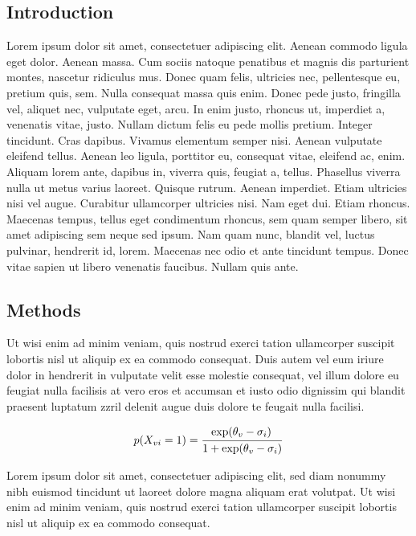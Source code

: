\documentclass[a1paper]{article}
\begin{document}
\begin{posterbox}
	\vspace{-10mm}
	\raggedright

	\section*{Introduction}
	Lorem ipsum dolor sit amet, consectetuer adipiscing elit. Aenean commodo ligula eget dolor. Aenean massa. Cum sociis natoque penatibus et magnis dis parturient montes, nascetur ridiculus mus. Donec quam felis, ultricies nec, pellentesque eu, pretium quis, sem. Nulla consequat massa quis enim. Donec pede justo, fringilla vel, aliquet nec, vulputate eget, arcu. In enim justo, rhoncus ut, imperdiet a, venenatis vitae, justo. Nullam dictum felis eu pede mollis pretium. Integer tincidunt. Cras dapibus. Vivamus elementum semper nisi. Aenean vulputate eleifend tellus. Aenean leo ligula, porttitor eu, consequat vitae, eleifend ac, enim. Aliquam lorem ante, dapibus in, viverra quis, feugiat a, tellus. Phasellus viverra nulla ut metus varius laoreet. Quisque rutrum. Aenean imperdiet. Etiam ultricies nisi vel augue. Curabitur ullamcorper ultricies nisi. Nam eget dui. Etiam rhoncus. Maecenas tempus, tellus eget condimentum rhoncus, sem quam semper libero, sit amet adipiscing sem neque sed ipsum. Nam quam nunc, blandit vel, luctus pulvinar, hendrerit id, lorem. Maecenas nec odio et ante tincidunt tempus. Donec vitae sapien ut libero venenatis faucibus. Nullam quis ante.
\end{posterbox}

\vfill

\begin{posterbox}
	\vspace{-10mm}
	\raggedright

	\section*{Methods}
	Ut wisi enim ad minim veniam, quis nostrud exerci tation ullamcorper suscipit lobortis nisl ut aliquip ex ea commodo consequat. Duis autem vel eum iriure dolor in hendrerit in vulputate velit esse molestie consequat, vel illum dolore eu feugiat nulla facilisis at vero eros et accumsan et iusto odio dignissim qui blandit praesent luptatum zzril delenit augue duis dolore te feugait nulla facilisi.

	$$
	 p\!\left(X_{vi} = 1\right) = \frac{\exp\!\left(\theta_v - \sigma_i\right)\strut}
	 {\strut 1 + \exp\!\left(
	 \theta_v - \sigma_i\right)}
	$$

	Lorem ipsum dolor sit amet, consectetuer adipiscing elit, sed diam nonummy nibh euismod tincidunt ut laoreet dolore magna aliquam erat volutpat. Ut wisi enim ad minim veniam, quis nostrud exerci tation ullamcorper suscipit lobortis nisl ut aliquip ex ea commodo consequat.
\end{posterbox}
\end{document}
